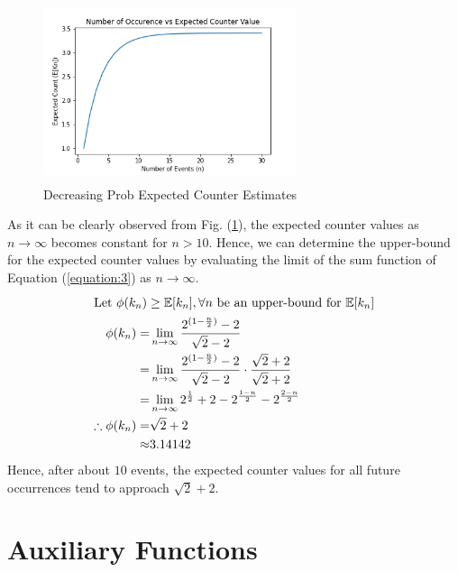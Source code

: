 \documentclass[longpaper, english, final, times]{revdetua}
\begin{document}
		\begin{figure}
			\begin{center}
				\label{figure:decreasingProb}
				\caption{Decreasing Prob Expected Counter Estimates}
				\includegraphics[width=280px, height=200px]{imgs/decreasing.png}
			\end{center}		
		\end{figure}
	
		As it can be clearly observed from Fig. (\ref{figure:decreasingProb}), the expected counter values as $n\to \infty$ becomes constant for $n > 10$. Hence, we can determine the upper-bound for the expected counter values by evaluating the limit of the sum function of Equation (\ref{equation:3}) as $n \to \infty$.
		\begin{align*}
			\intertext{Let $\phi(k_n) \ge \mathbb{E}[k_n], \forall n$ be an upper-bound for $\mathbb{E}[k_n]$}
			\phi(k_n)=&\lim_{n\to \infty}\dfrac{2^{(1-\frac{n}{2})}-2}{\sqrt{2}-2} \\
			=&\lim_{n\to \infty}\dfrac{2^{(1-\frac{n}{2})}-2}{\sqrt{2}-2}\cdot \dfrac{\sqrt{2}+2}{\sqrt{2}+2}\\
			=&\lim_{n\to \infty} 2^{\frac{1}{2}}+2-2^{\frac{1-n}{2}}-2^{\frac{2-n}{2}} \\
			\therefore \phi(k_n)=&\sqrt{2}+2 \\
			\approx & 3.14142
		\end{align*}
		Hence, after about $10$ events, the expected counter values for all future occurrences tend to approach $\sqrt{2}+2$.
	
	\section{Auxiliary Functions}
	
		
	
\end{document}
